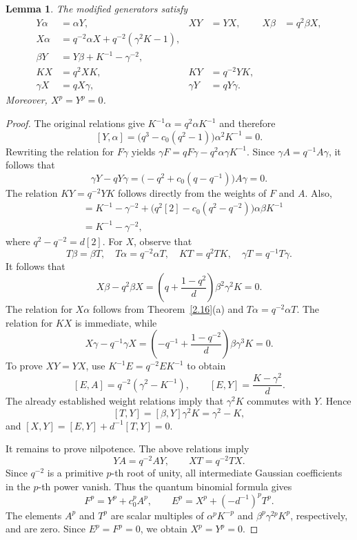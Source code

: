 \documentclass[10pt,oneside]{amsart}
\newtheorem{lemma}[proposition]{Lemma}
\theoremstyle{definition}
\begin{document}
\begin{lemma}\label{lem:modified}
The modified generators satisfy
\begin{align}
 Y\alpha&=\alpha Y, & XY&=YX, & X\beta&=q^2\beta X,\label{eq:commute}\\
 X\alpha&=q^{-2}\alpha X+q^{-2}(\gamma^2K-1),\label{eq:xa}\\
 \beta Y&=Y\beta+K^{-1}-\gamma^{-2},\label{eq:by}\\
 KX&=q^2XK,&KY&=q^{-2}YK,\label{eq:Kweight}\\
 \gamma X&=qX\gamma,&\gamma Y&=qY\gamma.\label{eq:Gweight}
\end{align}
Moreover, $X^p=Y^p=0$.
\end{lemma}
\begin{proof}
 The original relations give $K^{-1}\alpha=q^2\alpha K^{-1}$ and therefore
\[
 [Y,\alpha]=\bigl(q^3-c_0(q^2-1)\bigr)\alpha^2K^{-1}=0.
\]
Rewriting the relation for $F\gamma$ yields
 $\gamma F=qF\gamma-q^2\alpha\gamma K^{-1}.$
Since $\gamma A=q^{-1}A\gamma$, it follows that
\[
 \gamma Y-qY\gamma=
 \bigl(-q^2+c_0(q-q^{-1})\bigr)A\gamma=0.
\]
The relation $KY=q^{-2}YK$ follows directly from the weights of $F$ and $A$. Also,
\begin{align*}
 [\beta,Y]
 &=K^{-1}-\gamma^{-2}
 +\bigl(q^2[2]-c_0(q^2-q^{-2})\bigr)\alpha\beta K^{-1}\\
 &=K^{-1}-\gamma^{-2},
\end{align*}
where $q^2-q^{-2}=d[2]$.
For $X$, observe that
\[
 T\beta=\beta T,\quad T\alpha=q^{-2}\alpha T,
 \quad KT=q^2TK,\quad\gamma T=q^{-1}T\gamma.
\]
It follows that
\[
 X\beta-q^2\beta X
 =\left(q+\frac{1-q^2}{d}\right)\beta^2\gamma^2K=0.
\]
The relation for $X\alpha$ follows from Theorem~\ref{2.16}(a) and $T\alpha=q^{-2}\alpha T$. The relation for $KX$ is immediate, while
\[
 X\gamma-q^{-1}\gamma X
 =\left(-q^{-1}+\frac{1-q^{-2}}{d}\right)\beta\gamma^3K=0.
\]
To prove $XY=YX$, use $K^{-1}E=q^{-2}EK^{-1}$ to obtain
\[
 [E,A]=q^{-2}(\gamma^2-K^{-1}),\qquad
 [E,Y]=\frac{K-\gamma^2}{d}.
\]
The already established weight relations imply that $\gamma^2K$ commutes with $Y$. Hence
\[
 [T,Y]=[\beta,Y]\gamma^2K=\gamma^2-K,
\]
and $[X,Y]=[E,Y]+d^{-1}[T,Y]=0$.

It remains to prove nilpotence. The above relations imply
\[
 YA=q^{-2}AY,\qquad XT=q^{-2}TX.
\]
Since $q^{-2}$ is a primitive $p$-th root of unity, all intermediate Gaussian coefficients in the $p$-th power vanish. Thus the quantum binomial formula gives
\[
 F^p=Y^p+c_0^pA^p,
 \qquad E^p=X^p+(-d^{-1})^pT^p.
\]
The elements $A^p$ and $T^p$ are scalar multiples of $\alpha^pK^{-p}$ and $\beta^p\gamma^{2p}K^p$, respectively, and are zero. Since $E^p=F^p=0$, we obtain $X^p=Y^p=0$.
\end{proof}
\end{document}
